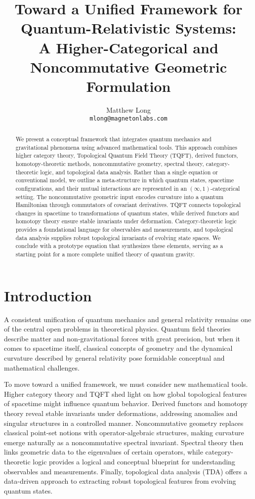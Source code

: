 \documentclass[12pt]{article}
\title{Toward a Unified Framework for Quantum-Relativistic Systems:\\A Higher-Categorical and Noncommutative Geometric Formulation}
\author{Matthew Long \\ \texttt{mlong@magnetonlabs.com}}
\date{}
\begin{document}
\maketitle

\begin{abstract}
We present a conceptual framework that integrates quantum mechanics and gravitational phenomena using advanced mathematical tools. This approach combines higher category theory, Topological Quantum Field Theory (TQFT), derived functors, homotopy-theoretic methods, noncommutative geometry, spectral theory, category-theoretic logic, and topological data analysis. Rather than a single equation or conventional model, we outline a meta-structure in which quantum states, spacetime configurations, and their mutual interactions are represented in an $(\infty,1)$-categorical setting. The noncommutative geometric input encodes curvature into a quantum Hamiltonian through commutators of covariant derivatives. TQFT connects topological changes in spacetime to transformations of quantum states, while derived functors and homotopy theory ensure stable invariants under deformation. Category-theoretic logic provides a foundational language for observables and measurements, and topological data analysis supplies robust topological invariants of evolving state spaces. We conclude with a prototype equation that synthesizes these elements, serving as a starting point for a more complete unified theory of quantum gravity.
\end{abstract}

\section{Introduction}
A consistent unification of quantum mechanics and general relativity remains one of the central open problems in theoretical physics. Quantum field theories describe matter and non-gravitational forces with great precision, but when it comes to spacetime itself, classical concepts of geometry and the dynamical curvature described by general relativity pose formidable conceptual and mathematical challenges.

To move toward a unified framework, we must consider new mathematical tools. Higher category theory and TQFT shed light on how global topological features of spacetime might influence quantum behavior. Derived functors and homotopy theory reveal stable invariants under deformations, addressing anomalies and singular structures in a controlled manner. Noncommutative geometry replaces classical point-set notions with operator-algebraic structures, making curvature emerge naturally as a noncommutative spectral invariant. Spectral theory then links geometric data to the eigenvalues of certain operators, while category-theoretic logic provides a logical and conceptual blueprint for understanding observables and measurements. Finally, topological data analysis (TDA) offers a data-driven approach to extracting robust topological features from evolving quantum states.
\end{document}
